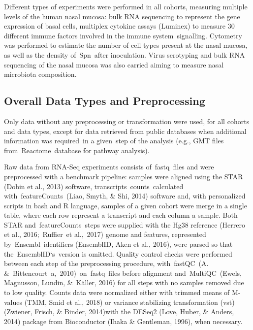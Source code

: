 \documentclass[
]{book}
\begin{document}
Different types of experiments were performed in all cohorts, measuring multiple levels of the human nasal mucosa: bulk RNA sequencing to represent the gene expression of basal cells, multiplex cytokine assays (Luminex) to measure 30 different immune factors involved in the immune system~signalling. Cytometry was performed to estimate the number of cell types present at the nasal mucosa, as well as the density of~Spn~after inoculation. Virus serotyping and bulk RNA sequencing of the nasal mucosa was also carried aiming to measure nasal microbiota composition.

\hypertarget{overall-data-types-and-preprocessing}{%
\subsection{Overall Data Types and Preprocessing}\label{overall-data-types-and-preprocessing}}

Only data without any preprocessing or transformation were used, for all cohorts and data types, except for data retrieved from public databases when additional information was required~in a given~step of the analysis (e.g., GMT files from~Reactome~database for pathway analysis).

Raw data from RNA-Seq experiments consists of~fastq~files and were preprocessed with a benchmark pipeline: samples were aligned using the STAR (Dobin et al., 2013)⁠ software, transcripts~counts~calculated with~featureCounts~(Liao, Smyth, \& Shi, 2014)⁠ software and, with personalized scripts in bash and R language, samples of a given cohort were merge in a single table, where each row represent a transcript and each column a sample. Both STAR and~featureCounts~steps were supplied with the Hg38 reference (Herrero et al., 2016;~Ruffier~et al.,~2017)⁠⁠ genome and features, represented by~Ensembl~identifiers (EnsemblID, Aken et al., 2016), were parsed so that the~EnsemblID`s~version is omitted. Quality control checks were performed between each step of the preprocessing procedure, with~fastQC~(A. \&~Bittencourt~a,~2010)⁠~on~fastq~files before alignment and~MultiQC~(Ewels, Magnusson, Lundin, \&~Käller, 2016)⁠ for all steps with no samples removed due to low quality. Counts data were normalized either with trimmed means of M-values (TMM, Smid et al., 2018)⁠ or variance stabilizing transformation (vst) (Zwiener, Frisch, \& Binder, 2014)⁠with the DESeq2 (Love, Huber, \& Anders, 2014)⁠ package from Bioconductor (Ihaka \& Gentleman, 1996)⁠⁠, when necessary.
\end{document}
